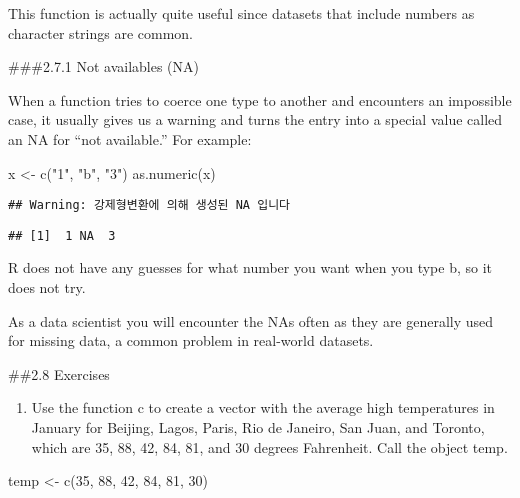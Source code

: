 \documentclass[
]{article}
\newenvironment{Shaded}{\begin{snugshade}}{\end{snugshade}}
\newcommand{\DecValTok}[1]{\textcolor[rgb]{0.00,0.00,0.81}{#1}}
\newcommand{\FunctionTok}[1]{\textcolor[rgb]{0.00,0.00,0.00}{#1}}
\newcommand{\NormalTok}[1]{#1}
\newcommand{\OtherTok}[1]{\textcolor[rgb]{0.56,0.35,0.01}{#1}}
\newcommand{\StringTok}[1]{\textcolor[rgb]{0.31,0.60,0.02}{#1}}
\providecommand{\tightlist}{%
  \setlength{\itemsep}{0pt}\setlength{\parskip}{0pt}}
\begin{document}
This function is actually quite useful since datasets that include
numbers as character strings are common.

\#\#\#2.7.1 Not availables (NA)

When a function tries to coerce one type to another and encounters an
impossible case, it usually gives us a warning and turns the entry into
a special value called an NA for ``not available.'' For example:

\begin{Shaded}
\begin{Highlighting}[]
\NormalTok{x }\OtherTok{\textless{}{-}} \FunctionTok{c}\NormalTok{(}\StringTok{"1"}\NormalTok{, }\StringTok{"b"}\NormalTok{, }\StringTok{"3"}\NormalTok{)}
\FunctionTok{as.numeric}\NormalTok{(x)}
\end{Highlighting}
\end{Shaded}

\begin{verbatim}
## Warning: 강제형변환에 의해 생성된 NA 입니다
\end{verbatim}

\begin{verbatim}
## [1]  1 NA  3
\end{verbatim}

R does not have any guesses for what number you want when you type b, so
it does not try.

As a data scientist you will encounter the NAs often as they are
generally used for missing data, a common problem in real-world
datasets.

\#\#2.8 Exercises

\begin{enumerate}
\def\labelenumi{\arabic{enumi}.}
\tightlist
\item
  Use the function c to create a vector with the average high
  temperatures in January for Beijing, Lagos, Paris, Rio de Janeiro, San
  Juan, and Toronto, which are 35, 88, 42, 84, 81, and 30 degrees
  Fahrenheit. Call the object temp.
\end{enumerate}

\begin{Shaded}
\begin{Highlighting}[]
\NormalTok{temp }\OtherTok{\textless{}{-}} \FunctionTok{c}\NormalTok{(}\DecValTok{35}\NormalTok{, }\DecValTok{88}\NormalTok{, }\DecValTok{42}\NormalTok{, }\DecValTok{84}\NormalTok{, }\DecValTok{81}\NormalTok{, }\DecValTok{30}\NormalTok{)}
\end{Highlighting}
\end{Shaded}
\end{document}
